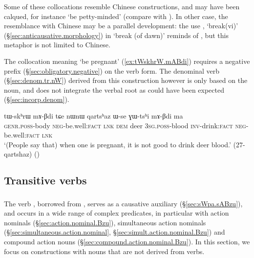 Some of these collocations resemble Chinese constructions, and may have been calqued, for instance  `be petty-minded' (compare with ). In other case, the resemblance with Chinese may be a parallel development: the use , `break(vi)' (§\ref{sec:anticausative.morphology}) in  `break (of dawn)' reminds of , but this metaphor is not limited to Chinese.

The collocation meaning  `be pregnant' (\ref{ex:tWskhrW.mABdi}) requires a negative prefix (§\ref{sec:obligatory.negative}) on the verb form. The denominal verb   (§\ref{sec:denom.tr.nW}) derived from this construction however is only based on the noun, and does not integrate the verbal root as could have been expected (§\ref{sec:incorp.denom}).

 \begin{exe}
\ex \label{ex:tWskhrW.mABdi}
\gll tɯ-skʰrɯ mɤ-βdi tɕe nɯnɯ qartsʰaz ɯ-se ɣɯ-tsʰi mɤ-βdi ma \\
\textsc{genr}.\textsc{poss}-body \textsc{neg}-be.well:\textsc{fact} \textsc{lnk} \textsc{dem} deer \textsc{3sg}.\textsc{poss}-blood \textsc{inv}-drink:\textsc{fact} \textsc{neg}-be.well:\textsc{fact} \textsc{lnk} \\
\glt `(People say that) when one is pregnant, it is not good to drink deer blood.' (27-qartshaz)
()
\end{exe}


 
\subsection{Transitive verbs}  \label{sec:tr.light.verbs}

\subsubsection{ } \label{sec:Bzu.lv}
The verb , borrowed from , serves as a causative auxiliary (§\ref{sec:sWpa.sABzu}), and occurs in a wide range of complex predicates, in particular with action nominals (§\ref{sec:action.nominal.Bzu}), simultaneous action nominals (§\ref{sec:simultaneous.action.nominal}, §\ref{sec:simult.action.nominal.Bzu}) and compound action nouns (§\ref{sec:compound.action.nominal.Bzu}). In this section, we focus on constructions with nouns that are not derived from verbs.
  
